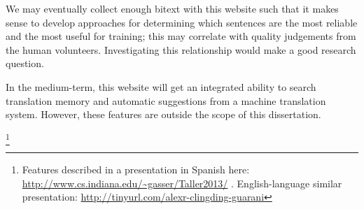 We may eventually collect enough bitext with this website such that it makes
sense to develop approaches for determining which sentences are the most
reliable and the most useful for training; this may correlate with quality
judgements from the human volunteers.
Investigating this relationship would make a good research question.

In the medium-term, this website will get an integrated ability to search
translation memory and automatic suggestions from a machine translation system.
However, these features are outside the scope of this dissertation.

\footnote{Features described in a presentation in Spanish here:
\url{http://www.cs.indiana.edu/~gasser/Taller2013/} . English-language similar
presentation: \url{http://tinyurl.com/alexr-clingding-guarani} }

